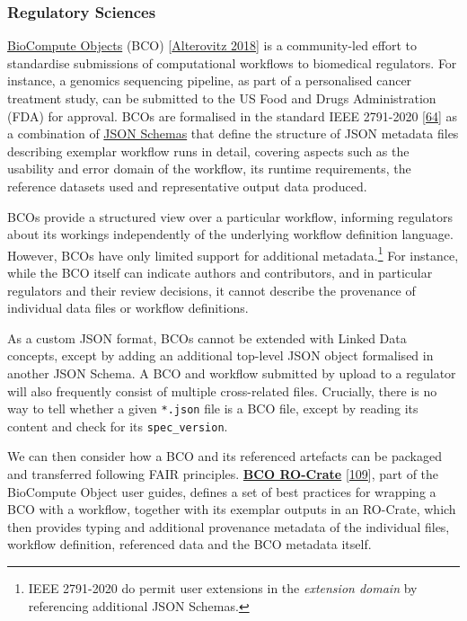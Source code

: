 \hypertarget{regulatorysciences}{%
\subsubsection{Regulatory Sciences}\label{regulatorysciences}}

\href{https://biocomputeobject.org/}{BioCompute Objects} (BCO)
{[}\href{https://doi.org/10.1371/journal.pbio.3000099}{Alterovitz 2018}{]} is a
community-led effort to standardise submissions of computational
workflows to biomedical regulators. For instance, a genomics sequencing
pipeline, as part of a personalised cancer treatment study, can be
submitted to the US Food and Drugs Administration (FDA) for approval.
BCOs are formalised in the standard IEEE 2791-2020
{[}\href{https://www.research.manchester.ac.uk/portal/en/publications/ieee-standard-for-bioinformatics-analyses-generated-by-highthroughput-sequencing-hts-to-facilitate-communication(936de52b-ac53-4f0e-9927-77fd7073e88d).html}{64}{]}
as a combination of \href{https://w3id.org/ieee/ieee-2791-schema/}{JSON
Schemas} that define the structure of JSON metadata files describing
exemplar workflow runs in detail, covering aspects such as the usability
and error domain of the workflow, its runtime requirements, the
reference datasets used and representative output data produced.

BCOs provide a structured view over a particular workflow, informing
regulators about its workings independently of the underlying workflow
definition language. However, BCOs have only limited support for
additional metadata.\footnote{IEEE 2791-2020 do permit user extensions
  in the \emph{extension domain} by referencing additional JSON Schemas.}
For instance, while the BCO itself can indicate authors and
contributors, and in particular regulators and their review decisions,
it cannot describe the provenance of individual data files or workflow
definitions.

As a custom JSON format, BCOs cannot be extended with Linked Data
concepts, except by adding an additional top-level JSON object
formalised in another JSON Schema. A BCO and workflow submitted by
upload to a regulator will also frequently consist of multiple
cross-related files. Crucially, there is no way to tell whether a given
\texttt{*.json} file is a BCO file, except by reading its content and
check for its \texttt{spec\_version}.

We can then consider how a BCO and its referenced artefacts can be
packaged and transferred following FAIR principles.
\href{https://biocompute-objects.github.io/bco-ro-crate/}{\textbf{BCO
RO-Crate}} {[}\href{https://doi.org/10.5281/zenodo.4633732}{109}{]},
part of the BioCompute Object user guides, defines a set of best
practices for wrapping a BCO with a workflow, together with its exemplar
outputs in an RO-Crate, which then provides typing and additional
provenance metadata of the individual files, workflow definition,
referenced data and the BCO metadata itself.

